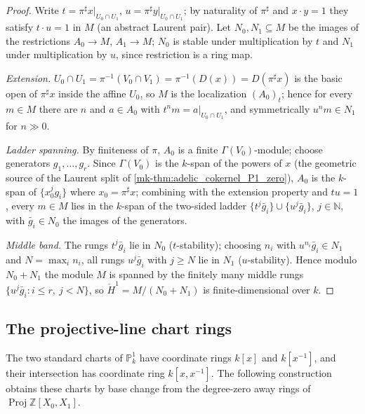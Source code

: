 \begin{proof}
  \leanok
  Write \(t = \pi^{\sharp} x|_{U_0 \cap U_1}\),
  \(u = \pi^{\sharp} y|_{U_0 \cap U_1}\); by naturality of \(\pi^{\sharp}\)
  and \(x \cdot y = 1\) they satisfy \(t \cdot u = 1\) in \(M\) (an
  abstract Laurent pair). Let \(N_0, N_1 \subseteq M\) be the images of
  the restrictions \(A_0 \to M\), \(A_1 \to M\); \(N_0\) is stable under
  multiplication by \(t\) and \(N_1\) under multiplication by \(u\),
  since restriction is a ring map.

  \emph{Extension.} \(U_0 \cap U_1 = \pi^{-1}(V_0 \cap V_1) =
  \pi^{-1}(D(x)) = D(\pi^{\sharp} x)\) is the basic open of
  \(\pi^{\sharp} x\) inside the affine \(U_0\), so \(M\) is the
  localization \((A_0)_t\); hence for every \(m \in M\) there are \(n\)
  and \(a \in A_0\) with \(t^n m = a|_{U_0 \cap U_1}\), and symmetrically
  \(u^n m \in N_1\) for \(n \gg 0\).

  \emph{Ladder spanning.} By finiteness of \(\pi\), \(A_0\) is a finite
  \(\Gamma(V_0)\)-module; choose generators \(g_1, \dots, g_r\). Since
  \(\Gamma(V_0)\) is the \(k\)-span of the powers of \(x\) (the geometric
  source of the Laurent split of \ref{mk-thm:adelic_cokernel_P1_zero}),
  \(A_0\) is the \(k\)-span of \(\{x_0^j g_i\}\) where
  \(x_0 = \pi^{\sharp} x\); combining with the extension property and
  \(tu = 1\), every \(m \in M\) lies in the \(k\)-span of the two-sided
  ladder \(\{t^j \bar{g}_i\} \cup \{u^j \bar{g}_i\}\), \(j \in
  \mathbb{N}\), with \(\bar{g}_i \in N_0\) the images of the generators.

  \emph{Middle band.} The rungs \(t^j \bar{g}_i\) lie in \(N_0\)
  (\(t\)-stability); choosing \(n_i\) with \(u^{n_i} \bar{g}_i \in N_1\)
  and \(N = \max_i n_i\), all rungs \(u^j \bar{g}_i\) with \(j \ge N\) lie
  in \(N_1\) (\(u\)-stability). Hence modulo \(N_0 + N_1\) the module
  \(M\) is spanned by the finitely many middle rungs
  \(\{u^j \bar{g}_i : i \le r,\ j < N\}\), so
  \(\check{H}^1 = M/(N_0 + N_1)\) is finite-dimensional over \(k\).
\end{proof}

\subsection{The projective-line chart rings}
\label{mk-sec:RiemannRoch_Adelic_P1ChartData}

The two standard charts of \(\mathbb P^1_k\) have coordinate rings
\(k[x]\) and \(k[x^{-1}]\), and their intersection has coordinate ring
\(k[x,x^{-1}]\).  The following construction obtains these charts by
base change from the degree-zero away rings of
\(\operatorname{Proj}\mathbb Z[X_0,X_1]\).


